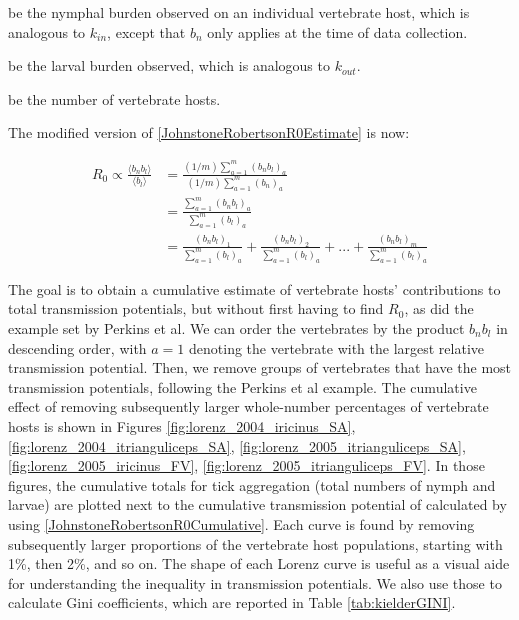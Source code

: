 \documentclass{article}
\begin{document}
\begin{description}[leftmargin=1cm, style=nextline]
	\item[$ b_n $] be the nymphal burden observed on an individual vertebrate host, which is analogous to $ k_{in} $, except that $ b_n $ only applies at the time of data collection.
	\item[$ b_l $] be the larval burden observed, which is analogous to $ k_{out} $.
	\item[$ m $] be the number of vertebrate hosts.
\end{description}

The modified version of \eqref{JohnstoneRobertsonR0Estimate} is now:
 
\begin{align} 
	R_0 \propto \frac{\langle b_n b_l \rangle}{\langle b_l \rangle} &= \frac{(1/m)\sum_{a=1}^m (b_n b_l)_a}{(1/m)\sum_{a=1}^m (b_n)_a} \nonumber \\ 
																	&= \frac{\sum_{a=1}^m (b_n b_l )_a}{\sum_{a=1}^m (b_l)_a} \nonumber \\ 
																	&= \frac{(b_n b_l)_1}{\sum_{a=1}^m (b_l)_a} + \frac{(b_n b_l)_2}{\sum_{a=1}^m (b_l)_a} + ... + \frac{(b_n b_l)_m}{\sum_{a=1}^m (b_l)_a} \label{JohnstoneRobertsonR0Cumulative}
\end{align}

The goal is to obtain a cumulative estimate of vertebrate hosts' contributions to total transmission potentials, but without first having to find $ R_0 $, as did the example set by Perkins et al. We can order the vertebrates by the product $ b_n b_l $ in descending order, with $ a=1 $ denoting the vertebrate with the largest relative transmission potential. Then, we remove groups of vertebrates that have the most transmission potentials, following the Perkins et al example. The cumulative effect of removing subsequently larger whole-number percentages of vertebrate hosts is shown in Figures \ref{fig:lorenz_2004_iricinus_SA}, \ref{fig:lorenz_2004_itrianguliceps_SA}, \ref{fig:lorenz_2005_itrianguliceps_SA}, \ref{fig:lorenz_2005_iricinus_FV}, \ref{fig:lorenz_2005_itrianguliceps_FV}. In those figures, the cumulative totals for tick aggregation (total numbers of nymph and larvae) are plotted next to the cumulative transmission potential of calculated by using \eqref{JohnstoneRobertsonR0Cumulative}. Each curve is found by removing subsequently larger proportions of the vertebrate host populations, starting with 1\%, then 2\%, and so on. The shape of each Lorenz curve is useful as a visual aide for understanding the inequality in transmission potentials. We also use those to calculate Gini coefficients, which are reported in Table \ref{tab:kielderGINI}.
\end{document}

